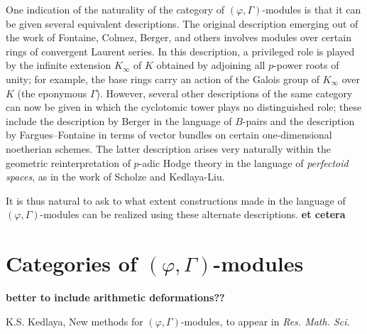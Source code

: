 \documentclass[12pt]{amsart}
\theoremstyle{definition}
\numberwithin{equation}{theorem}
\begin{document}
One indication of the naturality of the category of $(\varphi, \Gamma)$-modules is that it can be given several equivalent descriptions. The original description emerging out of the work of Fontaine, Colmez, Berger, and others involves modules over certain rings of convergent Laurent series. In this description, a privileged role is played by the infinite extension $K_\infty$ of $K$ obtained by adjoining all $p$-power roots of unity; for example, the base rings carry an action of the Galois group of $K_\infty$ over $K$ (the eponymous $\Gamma$). However, several other descriptions of the same category can now be given in which the cyclotomic tower plays no distinguished role; these include the description by Berger in the language of $B$-pairs and the description by Fargues--Fontaine in terms of vector bundles on certain one-dimensional noetherian schemes. The latter description arises very naturally within the geometric reinterpretation of $p$-adic Hodge theory in the language of \emph{perfectoid spaces}, as in the work of Scholze and Kedlaya-Liu.

It is thus natural to ask to what extent constructions made in the language of $(\varphi, \Gamma)$-modules can be realized using these alternate descriptions. \textbf{et cetera}

\section{Categories of $(\varphi, \Gamma)$-modules}

\textbf{better to include arithmetic deformations??}

\begin{thebibliography}{99}

K.S. Kedlaya, New methods for $(\varphi, \Gamma)$-modules,
to appear in \textit{Res. Math. Sci.}

\end{thebibliography}
\end{document}
